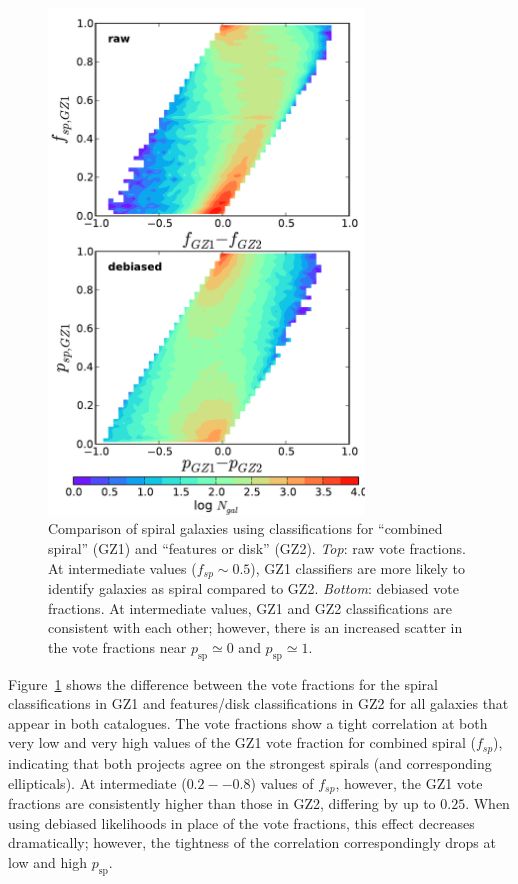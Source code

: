 \documentclass[useAMS,usenatbib]{mn2e}
\begin{document}
\begin{figure}
\includegraphics[angle=0,width=3.3in]{figures/gz1_gz2_trumpet.pdf}
\caption{Comparison of spiral galaxies using classifications for ``combined spiral'' (GZ1) and ``features or disk'' (GZ2). {\it Top}: raw vote fractions. At intermediate values ($f_{sp}\sim0.5$), GZ1 classifiers are more likely to identify galaxies as spiral compared to GZ2. {\it Bottom}: debiased vote fractions. At intermediate values, GZ1 and GZ2 classifications are consistent with each other; however, there is an increased scatter in the vote fractions near $p_\mathrm{sp}\simeq0$ and $p_\mathrm{sp}\simeq1$. 
\label{fig-trumpet}}
\end{figure}

Figure~\ref{fig-trumpet} shows the difference between the vote fractions for the spiral classifications in GZ1 and features/disk classifications in GZ2 for all galaxies that appear in both catalogues. The vote fractions show a tight correlation at both very low and very high values of the GZ1 vote fraction for combined spiral ($f_{sp}$), indicating that both projects agree on the strongest spirals (and corresponding ellipticals). At intermediate ($0.2--0.8$) values of $f_{sp}$, however, the GZ1 vote fractions are consistently higher than those in GZ2, differing by up to $0.25$. When using debiased likelihoods in place of the vote fractions, this effect decreases dramatically; however, the tightness of the correlation correspondingly drops at low and high $p_\mathrm{sp}$. 
\end{document}
